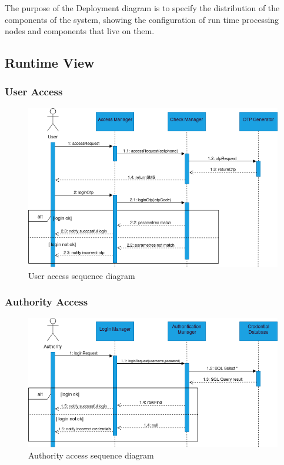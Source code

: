 	The purpose of the Deployment diagram is to specify the distribution of the components of the system, showing the configuration of run time processing nodes and components that live on them. 

\newpage

\subsection{Runtime View}
\subsubsection{User Access}
	\begin{figure}[H]
		\includegraphics[width=\textwidth]{Images/RunTimeViewUserAccess.png}		
		\caption{\label{fig:UserAccess}User access sequence diagram}
	\end{figure}
\subsubsection{Authority Access}
	\begin{figure}[H]
		\includegraphics[width=\textwidth]{Images/RunTimeViewAuthorityAccess.png}
		\caption{\label{fig:AuthorityAccess}Authority access sequence diagram}	
	\end{figure}
